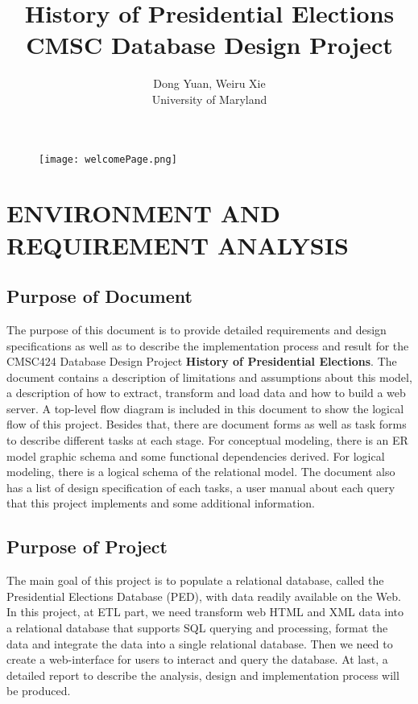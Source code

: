 \documentclass{article}
\begin{document}
\begin{figure}
\centering
\texttt{[image: welcomePage.png]}
\end{figure}

\title{ 
History of Presidential Elections \\ 
CMSC Database Design Project\\
}
\author{
Dong Yuan, Weiru Xie\\
University of Maryland
}
\date{}


\maketitle


\newpage
\tableofcontents
\newpage


\section{ENVIRONMENT AND REQUIREMENT ANALYSIS}
\subsection{Purpose of Document}
The purpose of this document is to provide detailed requirements and design specifications as well as to describe the implementation process and result for the CMSC424 Database Design Project \textbf{History of Presidential Elections}. The document contains a description of limitations and assumptions about this model, a description of how to extract, transform and load data and how to build a web server. A top-level flow diagram is included in this document to show the logical flow of this project. Besides that, there are document forms as well as task forms to describe different tasks at each stage. For conceptual modeling, there is an ER model graphic schema and some functional dependencies derived. For logical modeling, there is a logical schema of the relational model. The document also has a list of design specification of each tasks, a user manual about each query that this project implements and some additional information.

\subsection{Purpose of Project}
The main goal of this project is to populate a relational database, called the Presidential Elections Database (PED), with data readily available on the Web. In this project, at ETL part, we need transform web HTML and XML data into a relational database that supports SQL querying and processing, format the data and integrate the data into a single relational database. Then we need to create a web-interface for users to interact and query the database. At last, a detailed report to describe the analysis, design and implementation process will be produced.
\end{document}
